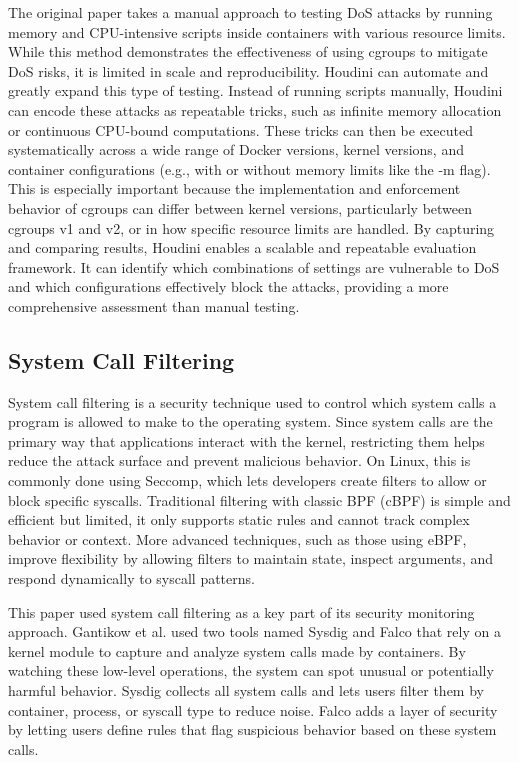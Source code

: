 \begin{doublespace}
The original paper takes a manual approach to testing DoS attacks by running memory and CPU-intensive scripts inside containers with various resource limits. While this method demonstrates the effectiveness of using cgroups to mitigate DoS risks, it is limited in scale and reproducibility. Houdini can automate and greatly expand this type of testing. Instead of running scripts manually, Houdini can encode these attacks as repeatable tricks, such as infinite memory allocation or continuous CPU-bound computations. These tricks can then be executed systematically across a wide range of Docker versions, kernel versions, and container configurations (e.g., with or without memory limits like the -m flag). This is especially important because the implementation and enforcement behavior of cgroups can differ between kernel versions, particularly between cgroups v1 and v2, or in how specific resource limits are handled. By capturing and comparing results, Houdini enables a scalable and repeatable evaluation framework. It can identify which combinations of settings are vulnerable to DoS and which configurations effectively block the attacks, providing a more comprehensive assessment than manual testing.


\subsection{System Call Filtering}

System call filtering is a security technique used to control which system calls a program is allowed to make to the operating system. Since system calls are the primary way that applications interact with the kernel, restricting them helps reduce the attack surface and prevent malicious behavior. On Linux, this is commonly done using Seccomp, which lets developers create filters to allow or block specific syscalls. Traditional filtering with classic BPF (cBPF) is simple and efficient but limited, it only supports static rules and cannot track complex behavior or context. More advanced techniques, such as those using eBPF, improve flexibility by allowing filters to maintain state, inspect arguments, and respond dynamically to syscall patterns. 

This paper used system call filtering as a key part of its security monitoring approach. Gantikow et al. \cite{gantikow2019rule} used two tools named Sysdig and Falco that rely on a kernel module to capture and analyze system calls made by containers. By watching these low-level operations, the system can spot unusual or potentially harmful behavior. Sysdig collects all system calls and lets users filter them by container, process, or syscall type to reduce noise. Falco adds a layer of security by letting users define rules that flag suspicious behavior based on these system calls.


\end{doublespace}
